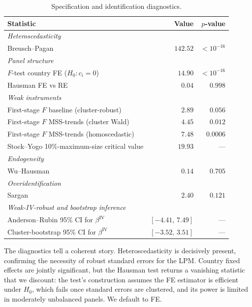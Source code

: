 \documentclass[11pt,a4paper]{article}
\begin{document}
\begin{table}[H]
\centering
\caption{Specification and identification diagnostics.}
\label{tab:diag}
\small
\begin{tabular}{lrr}
\toprule
Statistic & Value & $p$-value \\
\midrule
\textit{Heteroscedasticity} & & \\
Breusch--Pagan                                       & $142.52$ & $<10^{-16}$ \\
\textit{Panel structure} & & \\
$F$-test country FE ($H_0\colon c_i=0$)              & $14.90$  & $<10^{-16}$ \\
Hausman FE vs RE                                     & $0.04$   & $0.998$ \\
\textit{Weak instruments} & & \\
First-stage $F$ baseline (cluster-robust)            & $2.89$   & $0.056$ \\
First-stage $F$ MSS-trends (cluster Wald)            & $4.45$   & $0.012$ \\
First-stage $F$ MSS-trends (homoscedastic)           & $7.48$   & $0.0006$ \\
Stock--Yogo 10\%-maximum-size critical value         & $19.93$  & --- \\
\textit{Endogeneity} & & \\
Wu--Hausman                                          & $0.14$   & $0.705$ \\
\textit{Overidentification} & & \\
Sargan                                               & $2.40$   & $0.121$ \\
\textit{Weak-IV-robust and bootstrap inference} & & \\
Anderson--Rubin 95\% CI for $\beta^{\text{IV}}$      & $[-4.41,\,7.49]$ & --- \\
Cluster-bootstrap 95\% CI for $\beta^{\text{IV}}$    & $[-3.52,\,3.51]$ & --- \\
\bottomrule
\end{tabular}
\end{table}

The diagnostics tell a coherent story. Heteroscedasticity is decisively
present, confirming the necessity of robust standard errors for the LPM.
Country fixed effects are jointly significant, but the Hausman test
returns a vanishing statistic that we discount: the test's construction
assumes the FE estimator is efficient under $H_0$, which fails once
standard errors are clustered, and its power is limited in moderately
unbalanced panels. We default to FE.
\end{document}
